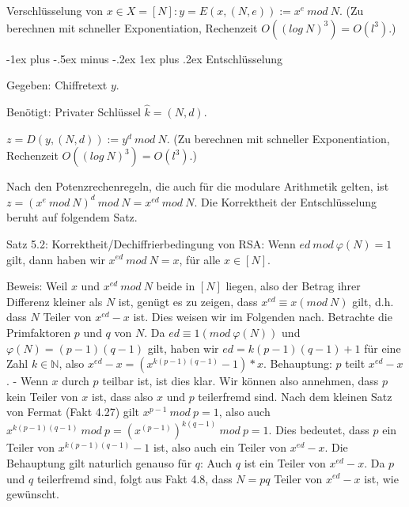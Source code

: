 \documentclass[a4paper]{article}
\makeatletter
\renewcommand{\subsubsection}{\@startsection{subsubsection}{3}{0mm}%
 {-1ex plus -.5ex minus -.2ex}%
 {1ex plus .2ex}%
 {\normalfont\small\bfseries}}
\makeatother
\begin{document}
\begin{multicols}{3}
        Verschlüsselung von $x\in X= [N]: y=E(x,(N,e)) :=x^e\ mod\ N$. (Zu berechnen mit schneller Exponentiation, Rechenzeit $O((log\ N)^3) =O(l^3)$.)

        \subsubsection{Entschlüsselung}
        \begin{itemize*}
            \item Gegeben: Chiffretext $y$.
            \item Benötigt: Privater Schlüssel $\hat{k}= (N,d)$.
        \end{itemize*}

    $z=D(y,(N,d)) :=y^d\ mod\ N$. (Zu berechnen mit schneller Exponentiation, Rechenzeit $O((log\ N)^3) =O(l^3)$.)

        Nach den Potenzrechenregeln, die auch für die modulare Arithmetik gelten, ist $z=(x^e\ mod\ N)^d\ mod\ N=x^{ed}\ mod\ N$. Die Korrektheit der Entschlüsselung beruht auf folgendem Satz.

        Satz 5.2: Korrektheit/Dechiffrierbedingung von RSA: Wenn $ed\ mod\ \varphi(N) = 1$ gilt, dann haben wir $x^{ed}\ mod\ N=x$, für alle $x\in [N]$.

        Beweis: Weil $x$ und $x^{ed}\ mod\ N$ beide in $[N]$ liegen, also der Betrag ihrer Differenz kleiner als $N$ ist, genügt es zu zeigen, dass $x^{ed} \equiv x(mod\ N)$ gilt, d.h. dass $N$ Teiler von $x^{ed}-x$ ist.
        Dies weisen wir im Folgenden nach. Betrachte die Primfaktoren $p$ und $q$ von $N$. Da $ed\equiv 1 (mod\ \varphi(N))$ und $\varphi(N) = (p-1)(q-1)$ gilt, haben wir $ed=k(p-1)(q-1) + 1$ für eine Zahl $k\in\mathbb{N}$, also $x^{ed}-x= (x^{k(p-1)(q-1)} -1)*x$.
        Behauptung: $p$ teilt $x^{ed}-x$. - Wenn $x$ durch $p$ teilbar ist, ist dies klar. Wir können also annehmen, dass $p$ kein Teiler von $x$ ist, dass also $x$ und $p$ teilerfremd sind. Nach dem kleinen Satz von Fermat (Fakt 4.27) gilt $x^{p-1}\ mod\ p= 1$, also auch $x^{k(p-1)(q-1)}\ mod\ p= (x^{(p-1)})^{k(q-1)}\ mod\ p= 1$.
        Dies bedeutet, dass $p$ ein Teiler von $x^{k(p-1)(q-1)}-1$ ist, also auch ein Teiler von $x^{ed}-x$.
        Die Behauptung gilt naturlich genauso für $q$: Auch $q$ ist ein Teiler von $x^{ed}-x$. Da $p$ und $q$ teilerfremd sind, folgt aus Fakt 4.8, dass $N=pq$ Teiler von $x^{ed}-x$ ist, wie gewünscht.


\end{multicols}
\end{document}
